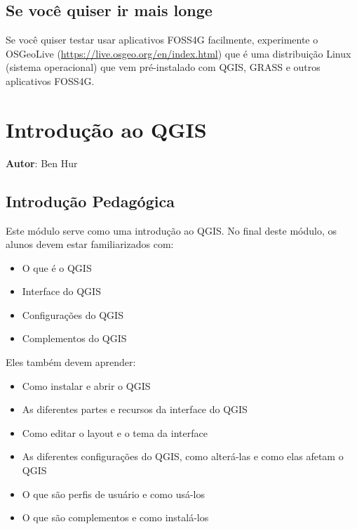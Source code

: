 \documentclass[
  portuguese,
]{krantz}
\providecommand{\tightlist}{%
  \setlength{\itemsep}{0pt}\setlength{\parskip}{0pt}}
\begin{document}
\hypertarget{se-vocuxea-quiser-ir-mais-longe}{%
\section{Se você quiser ir mais longe}\label{se-vocuxea-quiser-ir-mais-longe}}

Se você quiser testar usar aplicativos FOSS4G facilmente, experimente o OSGeoLive (\url{https://live.osgeo.org/en/index.html}) que é uma distribuição Linux (sistema operacional) que vem pré-instalado com QGIS, GRASS e outros aplicativos FOSS4G.

\hypertarget{introduuxe7uxe3o-ao-qgis}{%
\chapter{Introdução ao QGIS}\label{introduuxe7uxe3o-ao-qgis}}

\textbf{Autor}: Ben Hur

\hypertarget{introduuxe7uxe3o-pedaguxf3gica-1}{%
\section{Introdução Pedagógica}\label{introduuxe7uxe3o-pedaguxf3gica-1}}

Este módulo serve como uma introdução ao QGIS. No final deste módulo, os alunos devem estar familiarizados com:

\begin{itemize}
\tightlist
\item
  O que é o QGIS
\item
  Interface do QGIS
\item
  Configurações do QGIS
\item
  Complementos do QGIS
\end{itemize}

Eles também devem aprender:

\begin{itemize}
\tightlist
\item
  Como instalar e abrir o QGIS
\item
  As diferentes partes e recursos da interface do QGIS
\item
  Como editar o layout e o tema da interface
\item
  As diferentes configurações do QGIS, como alterá-las e como elas afetam o QGIS
\item
  O que são perfis de usuário e como usá-los
\item
  O que são complementos e como instalá-los
\end{itemize}
\end{document}
